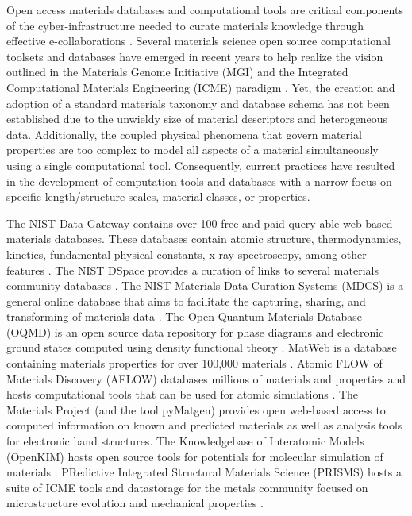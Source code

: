 \documentclass{bmcart}
\begin{document}
Open access materials databases and computational tools are critical
components of the cyber-infrastructure needed to curate materials
knowledge through effective e-collaborations
\cite{bhat2015strategy}. Several materials science open source
computational toolsets and databases have emerged in recent years to
help realize the vision outlined in the Materials Genome Initiative
(MGI) and the Integrated Computational Materials Engineering (ICME)
paradigm \cite{ward2012materials, allison2006integrated, MGIwhite,
  MGI2014, allison2011integrated, olson2000designing,
  national2008integrated, schmitz2012integrative, robinson2013tms,
  allisonintegrated, TMSfieldstudy}. Yet, the creation and adoption of
a standard materials taxonomy and database schema has not been
established due to the unwieldy size of material descriptors and
heterogeneous data. Additionally, the coupled physical phenomena that
govern material properties are too complex to model all aspects of a
material simultaneously using a single computational
tool. Consequently, current practices have resulted in the development
of computation tools and databases with a narrow focus on specific
length/structure scales, material classes, or properties.

The NIST Data Gateway contains over 100 free and paid query-able
web-based materials databases. These databases contain atomic
structure, thermodynamics, kinetics, fundamental physical constants,
x-ray spectroscopy, among other features \cite{NISTgateway}. The NIST
DSpace provides a curation of links to several materials community
databases \cite{nist2015dspace}. The NIST Materials Data Curation
Systems (MDCS) is a general online database that aims to facilitate
the capturing, sharing, and transforming of materials data
\cite{NISTDCS}. The Open Quantum Materials Database (OQMD) is an open
source data repository for phase diagrams and electronic ground states
computed using density functional theory
\cite{saal2013materials}. MatWeb is a database containing materials
properties for over 100,000 materials \cite{matweb}.  Atomic FLOW of
Materials Discovery (AFLOW) databases millions of materials and
properties and hosts computational tools that can be used for atomic
simulations \cite{curtarolo2012aflow}. The Materials Project (and the
tool pyMatgen) \cite{ong2013python, jain2013commentary} provides open
web-based access to computed information on known and predicted
materials as well as analysis tools for electronic band
structures. The Knowledgebase of Interatomic Models (OpenKIM) hosts
open source tools for potentials for molecular simulation of materials
\cite{kim2010project}. PRedictive Integrated Structural Materials
Science (PRISMS) hosts a suite of ICME tools and datastorage for the
metals community focused on microstructure evolution and mechanical
properties \cite{prism}.
\end{document}
